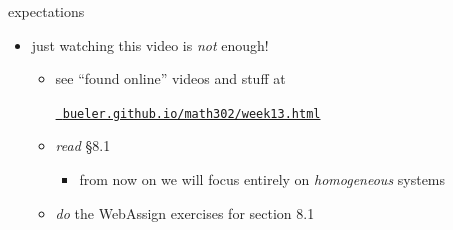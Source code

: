 \documentclass[urlcolor=blue,dvipsnames]{beamer}
\begin{document}
\begin{frame}{expectations}

\begin{itemize}
\item just watching this video is \emph{not} enough!
     \begin{itemize}
     \item see ``found online'' videos and stuff at

     \centerline{\href{https://bueler.github.io/math302/week13.html}{\tt \color{cyan} bueler.github.io/math302/week13.html}}
     \item \emph{read} \S8.1
         \begin{itemize}
         \item from now on we will focus entirely on \emph{homogeneous} systems
         \end{itemize}
     \item \emph{do} the WebAssign exercises for section 8.1
     \end{itemize}
\end{itemize}
\end{frame}
\end{document}
